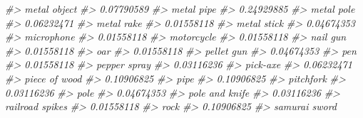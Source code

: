 \documentclass[
  12pt,
  openany]{book}
\newenvironment{Shaded}{\begin{snugshade}}{\end{snugshade}}
\newcommand{\CommentTok}[1]{\textcolor[rgb]{0.37,0.37,0.37}{\textit{#1}}}
\begin{document}
\begin{Shaded}
\begin{Highlighting}[]
\CommentTok{\#\textgreater{}                     metal object }
\CommentTok{\#\textgreater{}                       0.07790589 }
\CommentTok{\#\textgreater{}                       metal pipe }
\CommentTok{\#\textgreater{}                       0.24929885 }
\CommentTok{\#\textgreater{}                       metal pole }
\CommentTok{\#\textgreater{}                       0.06232471 }
\CommentTok{\#\textgreater{}                       metal rake }
\CommentTok{\#\textgreater{}                       0.01558118 }
\CommentTok{\#\textgreater{}                      metal stick }
\CommentTok{\#\textgreater{}                       0.04674353 }
\CommentTok{\#\textgreater{}                       microphone }
\CommentTok{\#\textgreater{}                       0.01558118 }
\CommentTok{\#\textgreater{}                       motorcycle }
\CommentTok{\#\textgreater{}                       0.01558118 }
\CommentTok{\#\textgreater{}                         nail gun }
\CommentTok{\#\textgreater{}                       0.01558118 }
\CommentTok{\#\textgreater{}                              oar }
\CommentTok{\#\textgreater{}                       0.01558118 }
\CommentTok{\#\textgreater{}                       pellet gun }
\CommentTok{\#\textgreater{}                       0.04674353 }
\CommentTok{\#\textgreater{}                              pen }
\CommentTok{\#\textgreater{}                       0.01558118 }
\CommentTok{\#\textgreater{}                     pepper spray }
\CommentTok{\#\textgreater{}                       0.03116236 }
\CommentTok{\#\textgreater{}                         pick{-}axe }
\CommentTok{\#\textgreater{}                       0.06232471 }
\CommentTok{\#\textgreater{}                    piece of wood }
\CommentTok{\#\textgreater{}                       0.10906825 }
\CommentTok{\#\textgreater{}                             pipe }
\CommentTok{\#\textgreater{}                       0.10906825 }
\CommentTok{\#\textgreater{}                        pitchfork }
\CommentTok{\#\textgreater{}                       0.03116236 }
\CommentTok{\#\textgreater{}                             pole }
\CommentTok{\#\textgreater{}                       0.04674353 }
\CommentTok{\#\textgreater{}                   pole and knife }
\CommentTok{\#\textgreater{}                       0.03116236 }
\CommentTok{\#\textgreater{}                  railroad spikes }
\CommentTok{\#\textgreater{}                       0.01558118 }
\CommentTok{\#\textgreater{}                             rock }
\CommentTok{\#\textgreater{}                       0.10906825 }
\CommentTok{\#\textgreater{}                    samurai sword }

\end{Highlighting}
\end{Shaded}
\end{document}
